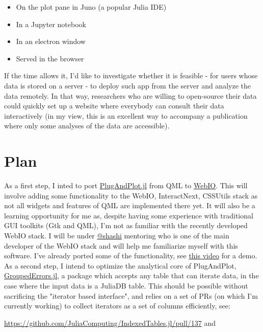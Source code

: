 \documentclass[10pt,a4paper]{report}
\begin{document}
\begin{itemize}
    \item On the plot pane in Juno (a popular Julia IDE)
    \item In a Jupyter notebook
    \item In an electron window
    \item Served in the browser
\end{itemize}

If the time allows it, I'd like to investigate whether it is feasible - for users whose data is stored on a server - to deploy such app from the server and analyze the data remotely. In that way, researchers who are willing to open-source their data could quickly set up a website where everybody can consult their data interactively (in my view, this is an excellent way to accompany a publication where only some analyses of the data are accessible).

\section*{Plan}

As a first step, I inted to port \href{https://github.com/piever/PlugAndPlot.jl}{PlugAndPlot.jl} from QML to \href{https://github.com/JuliaGizmos/WebIO.jl}{WebIO}. This will involve adding some functionality to the WebIO, InteractNext, CSSUtils stack as not all widgets and features of QML are implemented there yet. It will also be a learning opportunity for me as, despite having some experience with traditional GUI toolkits (Gtk and QML), I'm not as familiar with the recently developed WebIO stack. I will be under \href{https://github.com/shashi}{@shashi} mentoring who is one of the main developer of the WebIO stack and will help me familiarize myself with this software. I've already ported some of the functionality, see \href{https://vimeo.com/261643164}{this video} for a demo.\\

As a second step, I intend to optimize the analytical core of PlugAndPlot, \href{https://github.com/piever/GroupedErrors.jl}{GroupedErrors.jl}, a package which accepts any table that can iterate data, in the case where the input data is a JuliaDB table. This should be possible without sacrificing the "iterator based interface", and relies on a set of PRs (on which I'm currently working) to collect iterators as a set of columns efficiently, see:

 \url{https://github.com/JuliaComputing/IndexedTables.jl/pull/137} and
\end{document}
